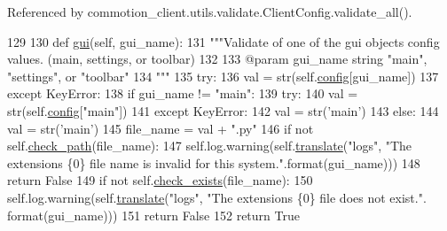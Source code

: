 Referenced by commotion\+\_\+client.\+utils.\+validate.\+Client\+Config.\+validate\+\_\+all().


\begin{DoxyCode}
129 
130     \textcolor{keyword}{def }\hyperlink{classcommotion__client_1_1utils_1_1validate_1_1ClientConfig_aa3a463fc48d9d7d219356d6150b4630f}{gui}(self, gui\_name):
131         \textcolor{stringliteral}{"""Validate of one of the gui objects config values. (main, settings, or toolbar)}
132 \textcolor{stringliteral}{}
133 \textcolor{stringliteral}{        @param gui\_name string "main", "settings", or "toolbar"}
134 \textcolor{stringliteral}{        """}
135         \textcolor{keywordflow}{try}:
136             val = str(self.\hyperlink{classcommotion__client_1_1utils_1_1validate_1_1ClientConfig_acce323dd2fef1e3c2819cd0ed068cb67}{config}[gui\_name])
137         \textcolor{keywordflow}{except} KeyError:
138             \textcolor{keywordflow}{if} gui\_name != \textcolor{stringliteral}{"main"}:
139                 \textcolor{keywordflow}{try}:
140                     val = str(self.\hyperlink{classcommotion__client_1_1utils_1_1validate_1_1ClientConfig_acce323dd2fef1e3c2819cd0ed068cb67}{config}[\textcolor{stringliteral}{"main"}])
141                 \textcolor{keywordflow}{except} KeyError:
142                     val = str(\textcolor{stringliteral}{'main'})
143             \textcolor{keywordflow}{else}:
144                 val = str(\textcolor{stringliteral}{'main'})
145         file\_name = val + \textcolor{stringliteral}{".py"}
146         \textcolor{keywordflow}{if} \textcolor{keywordflow}{not} self.\hyperlink{classcommotion__client_1_1utils_1_1validate_1_1ClientConfig_a3564ac59723769f067537a4ff21aa027}{check\_path}(file\_name):
147             self.log.warning(self.\hyperlink{classcommotion__client_1_1utils_1_1validate_1_1ClientConfig_a12d19377a853ce92cc0e0d758acdd804}{translate}(\textcolor{stringliteral}{"logs"}, \textcolor{stringliteral}{"The extensions \{0\} file name is invalid for
       this system."}.format(gui\_name)))
148             \textcolor{keywordflow}{return} \textcolor{keyword}{False}
149         \textcolor{keywordflow}{if} \textcolor{keywordflow}{not} self.\hyperlink{classcommotion__client_1_1utils_1_1validate_1_1ClientConfig_a8dbef5da5fb270a8842b3eed36bc595e}{check\_exists}(file\_name):
150             self.log.warning(self.\hyperlink{classcommotion__client_1_1utils_1_1validate_1_1ClientConfig_a12d19377a853ce92cc0e0d758acdd804}{translate}(\textcolor{stringliteral}{"logs"}, \textcolor{stringliteral}{"The extensions \{0\} file does not exist."}.
      format(gui\_name)))
151             \textcolor{keywordflow}{return} \textcolor{keyword}{False}
152         \textcolor{keywordflow}{return} \textcolor{keyword}{True}

\end{DoxyCode}
